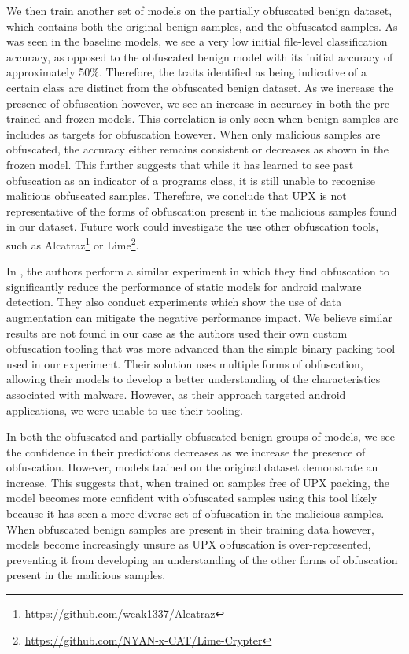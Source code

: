 \documentclass[main.tex]{subfiles}
\begin{document}
We then train another set of models on the partially obfuscated benign dataset, which contains both the original benign samples, and the obfuscated samples. As was seen in the baseline models, we see a very low initial file-level classification accuracy, as opposed to the obfuscated benign model with its initial accuracy of approximately 50\%. Therefore, the traits identified as being indicative of a certain class are distinct from the obfuscated benign dataset. As we increase the presence of obfuscation however, we see an increase in accuracy in both the pre-trained and frozen models. This correlation is only seen when benign samples are includes as targets for obfuscation however. When only malicious samples are obfuscated, the accuracy either remains consistent or decreases as shown in the frozen model. This further suggests that while it has learned to see past obfuscation as an indicator of a programs class, it is still unable to recognise malicious obfuscated samples. Therefore, we conclude that UPX is not representative of the forms of obfuscation present in the malicious samples found in our dataset. Future work could investigate the use other obfuscation tools, such as Alcatraz\footnote{\url{https://github.com/weak1337/Alcatraz}} or Lime\footnote{\url{https://github.com/NYAN-x-CAT/Lime-Crypter}}.

In \citep{bacciImpactCodeObfuscation2018}, the authors perform a similar experiment in which they find obfuscation to significantly reduce the performance of static models for android malware detection. They also conduct experiments which show the use of data augmentation can mitigate the negative performance impact. We believe similar results are not found in our case as the authors used their own custom obfuscation tooling that was more advanced than the simple binary packing tool used in our experiment. Their solution uses multiple forms of obfuscation, allowing their models to develop a better understanding of the characteristics associated with malware. However, as their approach targeted android applications, we were unable to use their tooling. 

In both the obfuscated and partially obfuscated benign groups of models, we see the confidence in their predictions decreases as we increase the presence of obfuscation. However, models trained on the original dataset demonstrate an increase. This suggests that, when trained on samples free of UPX packing, the model becomes more confident with obfuscated samples using this tool likely because it has seen a more diverse set of obfuscation in the malicious samples. When obfuscated benign samples are present in their training data however, models become increasingly unsure as UPX obfuscation is over-represented, preventing it from developing an understanding of the other forms of obfuscation present in the malicious samples. 
\end{document}

